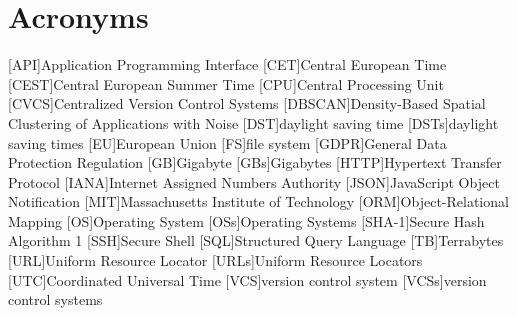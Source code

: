\chapter*{Acronyms}
\begin{acronym}
    [API]{Application Programming Interface}
    [CET]{Central European Time}
    [CEST]{Central European Summer Time}
    [CPU]{Central Processing Unit}
    [CVCS]{Centralized Version Control Systems}
    [DBSCAN]{Density-Based Spatial Clustering of Applications with Noise}
    [DST]{daylight saving time}
    [DSTs]{daylight saving times}
    [EU]{European Union}
    [FS]{file system}
    [GDPR]{General Data Protection Regulation}
    [GB]{Gigabyte}
    [GBs]{Gigabytes}
    [HTTP]{Hypertext Transfer Protocol}
    [IANA]{Internet Assigned Numbers Authority}
    [JSON]{JavaScript Object Notification}
    [MIT]{Massachusetts Institute of Technology}
    [ORM]{Object-Relational Mapping}
    [OS]{Operating System}
    [OSs]{Operating Systems}
    [SHA-1]{Secure Hash Algorithm 1}
    [SSH]{Secure Shell}
    [SQL]{Structured Query Language}
    [TB]{Terrabytes}
    [URL]{Uniform Resource Locator}
    [URLs]{Uniform Resource Locators}
    [UTC]{Coordinated Universal Time}
    [VCS]{version control system}
    [VCSs]{version control systems}
\end{acronym}
